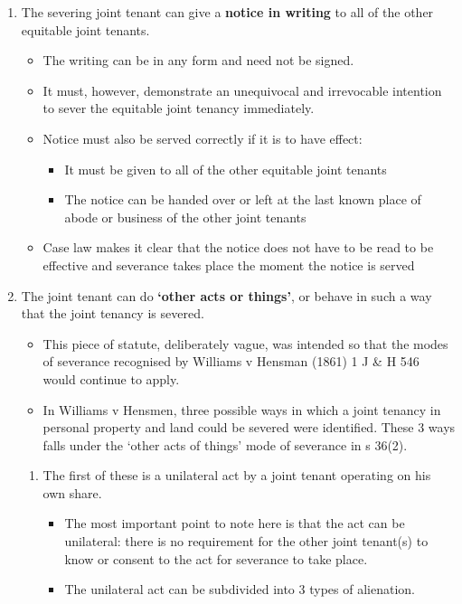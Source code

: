 \documentclass[
]{article}
\providecommand{\tightlist}{%
  \setlength{\itemsep}{0pt}\setlength{\parskip}{0pt}}
\begin{document}
\begin{enumerate}
\tightlist
\item
  The severing joint tenant can give a \textbf{notice in writing} to all
  of the other equitable joint tenants.

  \begin{itemize}
  \tightlist
  \item
    The writing can be in any form and need not be signed.
  \item
    It must, however, demonstrate an unequivocal and irrevocable
    intention to sever the equitable joint tenancy immediately.
  \item
    Notice must also be served correctly if it is to have effect:

    \begin{itemize}
    \tightlist
    \item
      It must be given to all of the other equitable joint tenants
    \item
      The notice can be handed over or left at the last known place of
      abode or business of the other joint tenants
    \end{itemize}
  \item
    Case law makes it clear that the notice does not have to be read to
    be effective and severance takes place the moment the notice is
    served
  \end{itemize}
\item
  The joint tenant can do \textbf{`other acts or things'}, or behave in
  such a way that the joint tenancy is severed.

  \begin{itemize}
  \tightlist
  \item
    This piece of statute, deliberately vague, was intended so that the
    modes of severance recognised by Williams v Hensman (1861) 1 J \& H
    546 would continue to apply.
  \item
    In Williams v Hensmen, three possible ways in which a joint tenancy
    in personal property and land could be severed were identified.
    These 3 ways falls under the `other acts of things' mode of
    severance in s 36(2).
  \end{itemize}

  \begin{enumerate}
  \tightlist
  \item
    The first of these is a unilateral act by a joint tenant operating
    on his own share.

    \begin{itemize}
    \tightlist
    \item
      The most important point to note here is that the act can be
      unilateral: there is no requirement for the other joint tenant(s)
      to know or consent to the act for severance to take place.
    \item
      The unilateral act can be subdivided into 3 types of alienation.


\end{itemize}
\end{enumerate}
\end{enumerate}
\end{document}
